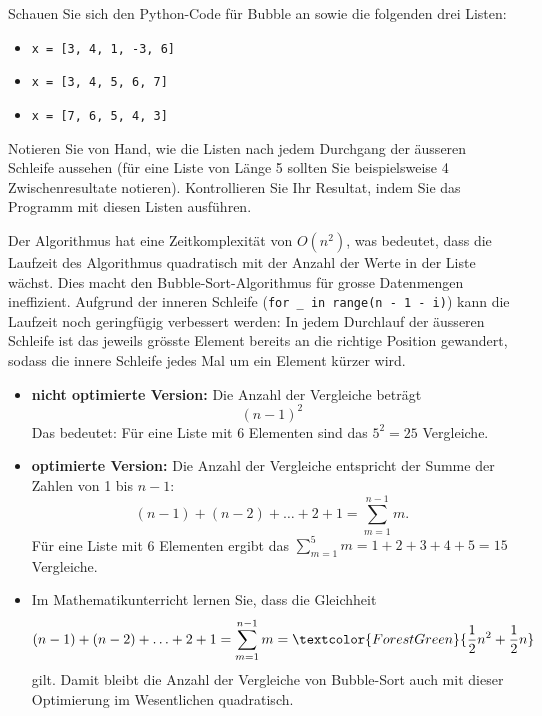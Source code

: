 
\begin{myexercise}
	Schauen Sie sich den Python-Code für Bubble an sowie die folgenden drei Listen:
	\begin{itemize}
		\item \lstinline|x = [3, 4, 1, -3, 6]|
		\item \lstinline|x = [3, 4, 5, 6, 7]| %
		\item \lstinline|x = [7, 6, 5, 4, 3]|
	\end{itemize}
	Notieren Sie von Hand, wie die Listen nach jedem Durchgang der äusseren Schleife aussehen (für eine Liste von Länge 5 sollten Sie beispielsweise 4 Zwischenresultate notieren). Kontrollieren Sie Ihr Resultat, indem Sie das Programm mit diesen Listen ausführen.
	\begin{myanswer}
		
	\end{myanswer}
\end{myexercise}

Der Algorithmus hat eine Zeitkomplexität von $O(n^2)$, was bedeutet, dass die Laufzeit des Algorithmus quadratisch mit der Anzahl der Werte in der Liste wächst. Dies macht den Bubble-Sort-Algorithmus für grosse Datenmengen ineffizient. Aufgrund der inneren Schleife (\lstinline|for _ in range(n - 1 - i)|) kann die Laufzeit noch geringfügig verbessert werden: In jedem Durchlauf der äusseren Schleife ist das jeweils grösste Element bereits an die richtige Position gewandert, sodass die innere Schleife jedes Mal um ein Element kürzer wird.

\begin{itemize}
	\item \textbf{nicht optimierte Version:} Die Anzahl der Vergleiche beträgt \[(n-1)^2\]
	      Das bedeutet: Für eine Liste mit 6 Elementen sind das $5^2 = 25$ Vergleiche.
	\item \textbf{optimierte Version:} Die Anzahl der Vergleiche entspricht der Summe der Zahlen von 1 bis $n-1$:
	      \[
		      (n-1) + (n-2) + \ldots + 2 + 1 = \displaystyle\sum_{m=1}^{n-1} m.
	      \]
	      Für eine Liste mit 6 Elementen ergibt das $\displaystyle\sum_{m=1}^{5} m = 1 + 2 + 3 + 4 + 5 = 15$ Vergleiche.
	\item Im Mathematikunterricht lernen Sie, dass die Gleichheit
	      \[
		      (n-1) + (n-2) + \ldots + 2 + 1 = \displaystyle\sum_{m=1}^{n-1} m = \textcolor{ForestGreen}{\frac{1}{2}n^2 + \frac{1}{2}n}
	      \]
	      gilt. Damit bleibt die Anzahl der Vergleiche von Bubble-Sort auch mit dieser Optimierung im Wesentlichen quadratisch.
\end{itemize}

